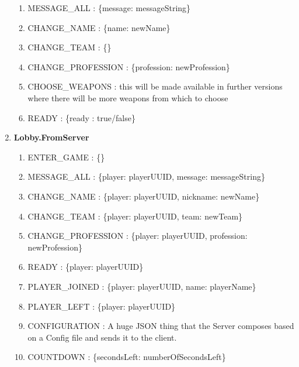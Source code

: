 \begin{enumerate}
  \begin{enumerate}
    
    \item MESSAGE\_ALL :
    \{message: messageString\}
    
	\item CHANGE\_NAME :
	\{name: newName\}
			
	\item CHANGE\_TEAM :
	\{\}		
	
	\item CHANGE\_PROFESSION :
	\{profession: newProfession\}
	
	\item CHOOSE\_WEAPONS :
	this will be made available in further versions where there will be more
	weapons from which to choose
	
	\item READY :
	\{ready : true/false\}    
     
  \end{enumerate}
  
  
  \item \textbf{Lobby.FromServer}
  
  \begin{enumerate}
    	\item ENTER\_GAME :
    	\{\}
		
		\item MESSAGE\_ALL :
		\{player: playerUUID, message: messageString\}
		
		\item CHANGE\_NAME :
		\{player: playerUUID, nickname: newName\}
		
		\item CHANGE\_TEAM :
		\{player: playerUUID, team: newTeam\}
				
		\item CHANGE\_PROFESSION :
		\{player: playerUUID, profession: newProfession\}
		
		\item READY :
		\{player: playerUUID\}
										
		\item PLAYER\_JOINED :
		\{player: playerUUID, name: playerName\}
		
		\item PLAYER\_LEFT :
		\{player: playerUUID\}
			
		\item CONFIGURATION :
		A huge JSON thing that the Server composes based on a Config file and sends it
		to the client. 
		
		\item COUNTDOWN :
		\{secondsLeft: numberOfSecondsLeft\}
		
  \end{enumerate}  
  
\end{enumerate}

